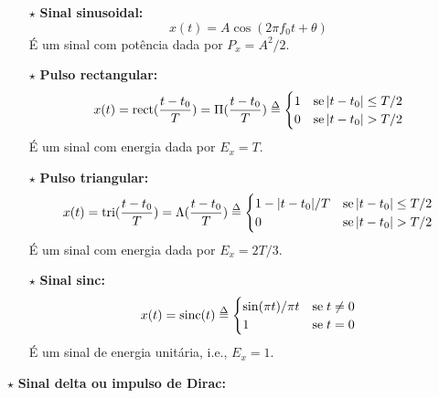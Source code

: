 \begin{mdframed}
    \begin{enumerate}[leftmargin=2em]
        \item[$\pmb{\star}$] \textbf{Sinal sinusoidal:}
            $$
                x(t) = A \cos{(2\pi f_0 t + \theta)}
            $$
        É um sinal com potência dada por $P_x = A^2/2$.
        \item[$\pmb{\star}$] \textbf{Pulso rectangular:}
            $$
                x(t) = \text{rect}(\frac{t-t_0}{T}) = \Pi(\frac{t-t_0}{T}) \delequal
                \begin{cases}
                    1 & \text{se}\, \left| t-t_0 \right| \leq T/2 \\
                    0 & \text{se}\, \left| t-t_0 \right| > T/2
                \end{cases}
            $$
        É um sinal com energia dada por $E_x = T$.
        \item[$\pmb{\star}$] \textbf{Pulso triangular:}
            $$
                x(t) = \text{tri}(\frac{t-t_0}{T}) = \Lambda(\frac{t-t_0}{T}) \delequal
                \begin{cases}
                    1 - \left|t-t_0\right|/T & \text{se}\, \left| t-t_0 \right| \leq T/2 \\
                    0 & \text{se}\, \left| t-t_0 \right| > T/2
                \end{cases}
            $$
        É um sinal com energia dada por $E_x = 2T/3$.
        \item[$\pmb{\star}$] \textbf{Sinal sinc\footnotemark[1]:}
            $$
                x(t) = \text{sinc}(t) \delequal 
                \begin{cases}
                    \sin(\pi t)/\pi t & \text{se}\; t \neq 0\\
                    1 & \text{se}\; t = 0
                \end{cases}
            $$
        É um sinal de energia unitária, i.e., $E_x = 1$.
    \end{enumerate}
\end{mdframed}


\noindent $\pmb{\star}$ \textbf{Sinal delta ou impulso de Dirac:}

